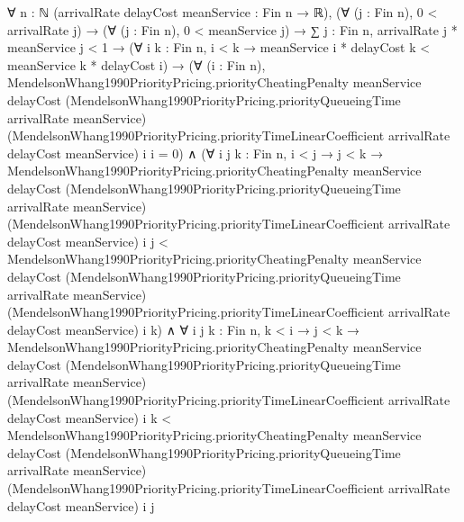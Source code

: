 \documentclass[10pt]{article}
\begin{document}
\begin{ReviewVerbatim}
∀ {n : ℕ} (arrivalRate delayCost meanService : Fin n → ℝ),
  (∀ (j : Fin n), 0 < arrivalRate j) →
    (∀ (j : Fin n), 0 < meanService j) →
      ∑ j : Fin n, arrivalRate j * meanService j < 1 →
        (∀ {i k : Fin n}, i < k → meanService i * delayCost k < meanService k * delayCost i) →
          (∀ (i : Fin n),
              MendelsonWhang1990PriorityPricing.priorityCheatingPenalty meanService delayCost
                  (MendelsonWhang1990PriorityPricing.priorityQueueingTime arrivalRate meanService)
                  (MendelsonWhang1990PriorityPricing.priorityTimeLinearCoefficient arrivalRate delayCost meanService) i
                  i =
                0) ∧
            (∀ {i j k : Fin n},
                i < j →
                  j < k →
                    MendelsonWhang1990PriorityPricing.priorityCheatingPenalty meanService delayCost
                        (MendelsonWhang1990PriorityPricing.priorityQueueingTime arrivalRate meanService)
                        (MendelsonWhang1990PriorityPricing.priorityTimeLinearCoefficient arrivalRate delayCost
                          meanService)
                        i j <
                      MendelsonWhang1990PriorityPricing.priorityCheatingPenalty meanService delayCost
                        (MendelsonWhang1990PriorityPricing.priorityQueueingTime arrivalRate meanService)
                        (MendelsonWhang1990PriorityPricing.priorityTimeLinearCoefficient arrivalRate delayCost
                          meanService)
                        i k) ∧
              ∀ {i j k : Fin n},
                k < i →
                  j < k →
                    MendelsonWhang1990PriorityPricing.priorityCheatingPenalty meanService delayCost
                        (MendelsonWhang1990PriorityPricing.priorityQueueingTime arrivalRate meanService)
                        (MendelsonWhang1990PriorityPricing.priorityTimeLinearCoefficient arrivalRate delayCost
                          meanService)
                        i k <
                      MendelsonWhang1990PriorityPricing.priorityCheatingPenalty meanService delayCost
                        (MendelsonWhang1990PriorityPricing.priorityQueueingTime arrivalRate meanService)
                        (MendelsonWhang1990PriorityPricing.priorityTimeLinearCoefficient arrivalRate delayCost
                          meanService)
                        i j
\end{ReviewVerbatim}
\end{document}
